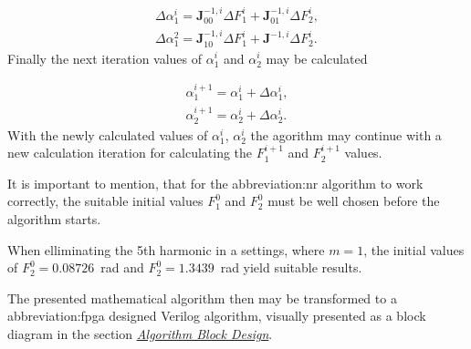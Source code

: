 \documentclass[a4paper, twoside, 11pt]{article}
\begin{document}
        \begin{equation}
            \begin{gathered}
                \Delta \alpha_1^i = \textbf{J}_{00}^{-1,i} \Delta F_1^i + \textbf{J}_{01}^{-1,i} \Delta F_2^i,\\
                \Delta \alpha_1^2 = \textbf{J}_{10}^{-1,i} \Delta F_1^i + \textbf{J}^{-1,i} \Delta F_2^i.
            \end{gathered}
        \end{equation}
        Finally the next iteration values of $\alpha_1^i$ and $\alpha_2^i$ may be calculated

        \begin{equation}
            \begin{gathered}
                \alpha_1^{i+1} = \alpha_1^i + \Delta \alpha_1^i,\\
                \alpha_2^{i+1} = \alpha_2^i + \Delta \alpha_2^i.
            \end{gathered}
        \end{equation}
        With the newly calculated values of $\alpha_1^i$, $\alpha_2^i$ the agorithm may continue with a new calculation iteration for calculating the $F_1^{i+1}$ and $F_2^{i+1}$ values.\par
        It is important to mention, that for the \gls{abbreviation:nr} algorithm to work correctly, the suitable initial values $F_1^0$ and $F_2^0$ must be well chosen before the algorithm starts.\par
        When elliminating the 5th harmonic in a settings, where $m = 1$, the initial values of $F_2^0 = 0.08726$~rad and $F_2^0 = 1.3439$~rad yield suitable results.\par
        The presented mathematical algorithm then may be transformed to a \gls{abbreviation:fpga} designed Verilog algorithm, visually presented as a block diagram in the section \hyperref[subsubsec:algorithm-block-design]{\textit{Algorithm Block Design}}.
\end{document}
